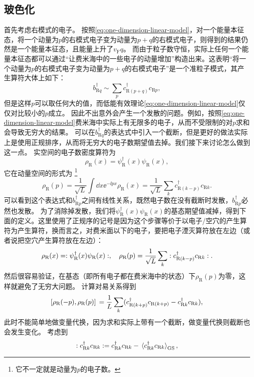 \subsection{玻色化}

首先考虑右模式的电子。
按照\eqref{eq:one-dimension-linear-model}，对一个能量本征态，将一个动量为$p$的右模式电子变为动量为$p+q$的右模式电子，则得到的结果仍然是一个能量本征态，且能量上升了$v_\text{F} q$。
而由于粒子数守恒，实际上任何一个能量本征态都可以通过“让费米海中的一些电子的动量增加”构造出来。这表明“将一个动量为$p$的右模式电子变为动量为$p+q$的右模式电子”是一个准粒子模式，其产生算符大体上如下：
\[
    {b}_{\text{R} q}^\dagger \sim \sum_p {c}^\dagger_{\text{R} (p+q)} {c}_{\text{R} p} ,
\]
但是这样$p$可以取任何大的值，而低能有效理论\eqref{eq:one-dimension-linear-model}仅仅对比较小的$p$成立。
因此不出意外会产生一个发散的问题。例如，按照\eqref{eq:one-dimension-linear-model}费米海中实际上有无限多的电子，从而不受限制的对$p$求和会导致无穷大的结果。
可以在${b}_{\text{R} q}^\dagger$的表达式中引入一个截断，但是更好的做法实际上是使用正规排序，从而将无穷大的电子数期望值去掉。我们接下来讨论怎么做到这一点。
实空间的电子数密度算符为
\[
    {\rho}_\text{R}(x) = {\psi}_\text{R}^\dagger(x) {\psi}_\text{R}(x),
\]
它在动量空间的形式为%
\footnote{它不一定就是动量为$p$的电子数。}%
\[
    {\rho}_\text{R}(p) = \frac{1}{\sqrt{L}} \int \dd{x} \ee^{-\ii p x} {\rho}_\text{R}(x) = \frac{1}{\sqrt{L}} \sum_k {c}^\dagger_{\text{R} (k - p)} {c}_{\text{R} k}.
\]
可以看到这个表达式和${b}^\dagger_{\text{R} p}$之间有线性关系，既然电子数在没有截断时发散，${b}^\dagger_{\text{R} p}$必然也发散。
为了消除掉发散，我们将${\psi}_\text{R}^\dagger(x) {\psi}_\text{R}(x)$的基态期望值减掉，得到下面的定义。这里使用了正规序的记号是因为这个步骤等价于以电子/空穴的产生算符为产生算符，换而言之，对费米面以下的电子，要把电子湮灭算符放在左边（或者说把空穴产生算符放在左边）：
\begin{equation}
    {\rho}_\text{R}(x) = : {\psi}_\text{R}^\dagger(x) {\psi}_\text{R}(x) :, \quad {\rho}_\text{R}(p) = \frac{1}{\sqrt{L}} \sum_k : {c}^\dagger_{\text{R} (k - p)} {c}_{\text{R} k} :.
\end{equation}
然后很容易验证，在基态（即所有电子都在费米海中的状态）下${\rho}_\text{R}(p)$为零，这样就避免了无穷大问题。
计算对易关系得到
\[
    \comm*{{\rho}_\text{R}(- p)}{{\rho}_\text{R}(p)} = \frac{1}{L} \sum_{k} ({c}^\dagger_{\text{R} (k + p)} {c}_{\text{R} (k + p)} - {c}^\dagger_{\text{R} k} {c}_{\text{R} k}),
\]
此时不能简单地做变量代换，因为求和实际上带有一个截断，做变量代换则截断也会发生变化。
考虑到
\[
    : {c}^\dagger_{\text{R} k} {c}_{\text{R} k} : = {c}^\dagger_{\text{R} k} {c}_{\text{R} k} - \expval*{{c}^\dagger_{\text{R} k} {c}_{\text{R} k}}_\text{GS},
\]
